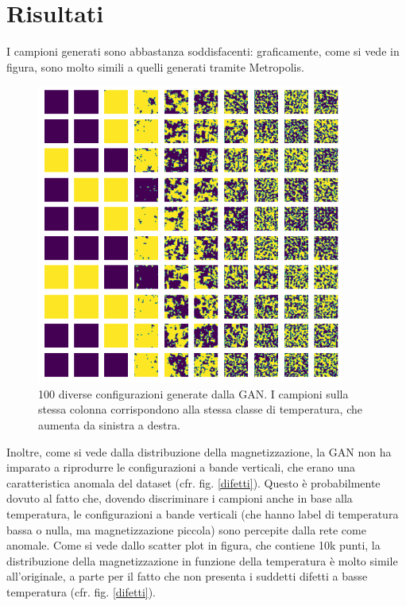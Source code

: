 \documentclass[a4paper]{article}
\begin{document}
\section{Risultati}
I campioni generati sono abbastanza soddisfacenti: graficamente, come si vede in figura, sono molto simili a quelli generati tramite Metropolis. 
\begin{figure}[H]
\includegraphics[width=0.9\textwidth]{ising.png}
\centering
\caption{100 diverse configurazioni generate dalla GAN. I campioni sulla stessa colonna corrispondono alla stessa classe di temperatura, che aumenta da sinistra a destra.}
\end{figure}
Inoltre, come si vede dalla distribuzione della magnetizzazione, la GAN non ha imparato a riprodurre le configurazioni a bande verticali, che erano una caratteristica anomala del dataset (cfr. fig. \ref{difetti}). Questo è probabilmente dovuto al fatto che, dovendo discriminare i campioni anche in base alla temperatura, le configurazioni a bande verticali (che hanno label di temperatura bassa o nulla, ma magnetizzazione piccola) sono percepite dalla rete come anomale.
\newpage
Come si vede dallo scatter plot in figura, che contiene 10k punti, la distribuzione della magnetizzazione in funzione della temperatura è molto simile all'originale, a parte per il fatto che non presenta i suddetti difetti a basse temperatura (cfr. fig. \ref{difetti}).
\end{document}
